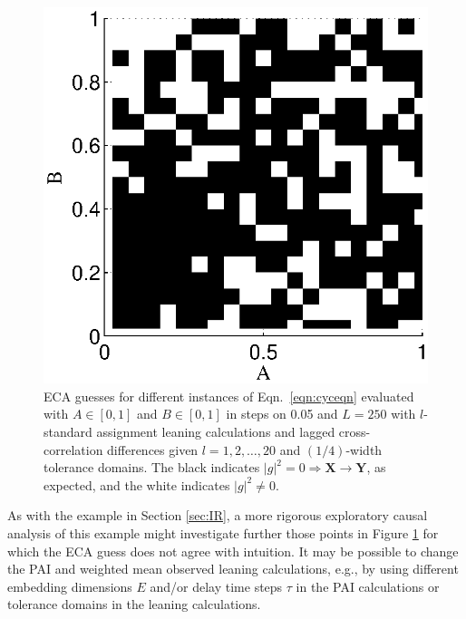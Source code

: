 \documentclass{article}[10pt]
\begin{document}
\begin{figure}[ht]
\begin{center}
\includegraphics[scale=0.8]{NoisyCyclicResponseExample_ECAguessMat.eps} 
\end{center}
\caption{ECA guesses for different instances of Eqn.\ \ref{eqn:cyceqn} evaluated with $A\in[0,1]$ and $B\in[0,1]$ in steps on 0.05 and $L=250$ with $l$-standard assignment leaning calculations and lagged cross-correlation differences given $l=1,2,\ldots,20$ and $(1/4)$-width tolerance domains.  The black indicates $|g|^2=0\Rightarrow\mathbf{X}\rightarrow\mathbf{Y}$, as expected, and the white indicates $|g|^2 \neq 0$.}
\label{fig:cycxyECAguess}
\end{figure}
As with the example in Section \ref{sec:IR}, a more rigorous exploratory causal analysis of this example might investigate further those points in Figure \ref{fig:cycxyECAguess} for which the ECA guess does not agree with intuition.  It may be possible to change the PAI and weighted mean observed leaning calculations, e.g., by using different embedding dimensions $E$ and/or delay time steps $\tau$ in the PAI calculations or tolerance domains in the leaning calculations.  
\end{document}
